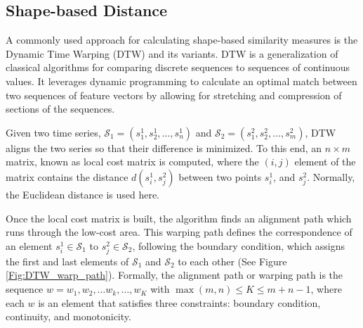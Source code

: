 \subsection{Shape-based Distance}
\label{sec:ShapeBasedDistance}

A commonly used approach for calculating shape-based similarity measures is the Dynamic Time Warping (DTW) \cite{Sakoe1978} and its variants. DTW is a generalization of classical algorithms for comparing discrete sequences to sequences of continuous values. It leverages dynamic programming to calculate an optimal match between two sequences of feature vectors by allowing for stretching and compression of sections of the sequences.  

Given two time series, $\mathcal{S}_{1} =\left(s^{1}_{1}, s^{1}_{2}, \ldots, s^{1}_{n}\right)$ and $\mathcal{S}_{2} = \left(s^{2}_{1}, s^{2}_{2}, \ldots, s^{2}_{m}\right)$, DTW aligns the two series so that their difference is minimized. To this end, an $n \times m$ matrix, known as local cost matrix is computed, where the $(i, j)$ element of the matrix contains the distance $d(s^{1}_{i}, s^{2}_{j})$ between two points $s^{1}_{i}$, and $s^{2}_{j}$. Normally, the Euclidean distance is used here.

Once the local cost matrix is built, the algorithm finds an alignment path which runs through the low-cost area. This warping path defines the correspondence of an element $s^{1}_{i} \in \mathcal{S}_{1}$ to $s^{2}_{j} \in \mathcal{S}_{2}$, following the boundary condition, which assigns the first and last elements of $\mathcal{S}_{1}$ and $\mathcal{S}_{2}$ to each other (See Figure \ref{Fig:DTW_warp_path}). Formally, the alignment path or warping path is the sequence $w = w_{1} , w_{2}, \ldots w_{k}, \ldots, w_{K}$ with $\max(m, n) \leq K \leq m + n-1$, where each $w$ is an element that satisfies three constraints: boundary condition, continuity, and monotonicity. 

